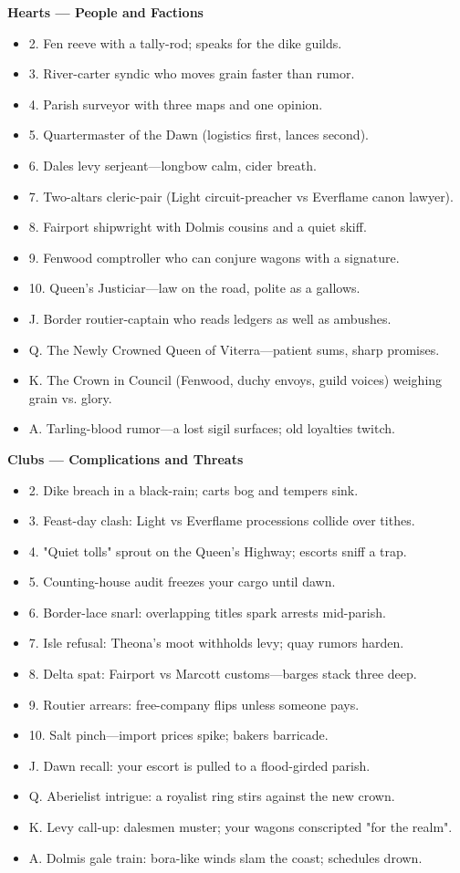 \textbf{Hearts — People and Factions}
\begin{itemize}
  \item 2. Fen reeve with a tally-rod; speaks for the dike guilds.
  \item 3. River-carter syndic who moves grain faster than rumor.
  \item 4. Parish surveyor with three maps and one opinion.
  \item 5. Quartermaster of the Dawn (logistics first, lances second).
  \item 6. Dales levy serjeant—longbow calm, cider breath.
  \item 7. Two-altars cleric-pair (Light circuit-preacher vs Everflame canon lawyer).
  \item 8. Fairport shipwright with Dolmis cousins and a quiet skiff.
  \item 9. Fenwood comptroller who can conjure wagons with a signature.
  \item 10. Queen's Justiciar—law on the road, polite as a gallows.
  \item J. Border routier-captain who reads ledgers as well as ambushes.
  \item Q. The Newly Crowned Queen of Viterra—patient sums, sharp promises.
  \item K. The Crown in Council (Fenwood, duchy envoys, guild voices) weighing grain vs. glory.
  \item A. Tarling-blood rumor—a lost sigil surfaces; old loyalties twitch.
\end{itemize}

\textbf{Clubs — Complications and Threats}
\begin{itemize}
  \item 2. Dike breach in a black-rain; carts bog and tempers sink.
  \item 3. Feast-day clash: Light vs Everflame processions collide over tithes.
  \item 4. "Quiet tolls" sprout on the Queen's Highway; escorts sniff a trap.
  \item 5. Counting-house audit freezes your cargo until dawn.
  \item 6. Border-lace snarl: overlapping titles spark arrests mid-parish.
  \item 7. Isle refusal: Theona's moot withholds levy; quay rumors harden.
  \item 8. Delta spat: Fairport vs Marcott customs—barges stack three deep.
  \item 9. Routier arrears: free-company flips unless someone pays.
  \item 10. Salt pinch—import prices spike; bakers barricade.
  \item J. Dawn recall: your escort is pulled to a flood-girded parish.
  \item Q. Aberielist intrigue: a royalist ring stirs against the new crown.
  \item K. Levy call-up: dalesmen muster; your wagons conscripted "for the realm".
  \item A. Dolmis gale train: bora-like winds slam the coast; schedules drown.
\end{itemize}

